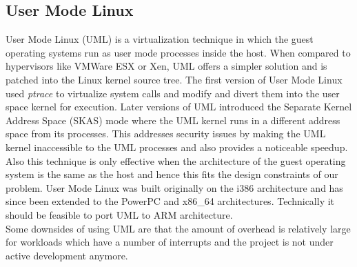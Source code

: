 \subsection{User Mode Linux}
User Mode Linux (UML) is a virtualization technique in which the guest operating systems run as user mode processes inside the host. When compared to hypervisors like VMWare ESX or Xen, UML offers a simpler solution and is patched into the Linux kernel source tree. The first version of User Mode Linux used \emph{ptrace} to virtualize system calls and modify and divert them into the user space kernel for execution. Later versions of UML introduced the Separate Kernel Address Space (SKAS) mode  where the UML kernel runs in a different address space from its processes. This addresses security issues by making the UML kernel inaccessible to the UML processes and also provides a noticeable speedup. Also this technique is only effective when the architecture of the guest operating system is the same as the host and hence this fits the design constraints of our problem. User Mode Linux was built originally on the i386 architecture and has since been extended to the PowerPC and x86\_64 architectures. Technically it should be feasible to port UML to ARM architecture. \\
Some downsides of using UML are that the amount of overhead is relatively large for workloads which have a number of interrupts and the project is not under active development anymore.

